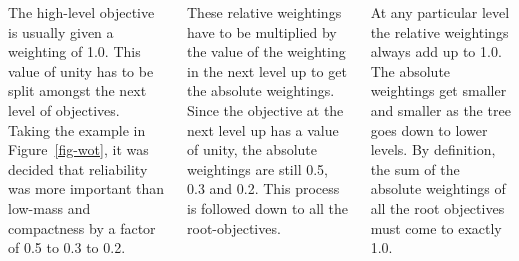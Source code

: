 \documentclass[20pt, a0paper, portrait]{tikzposter}
\begin{document}
\begin{columns}
{      \vspace{1em}

      The high-level objective is usually given a weighting of 1.0. This value of unity has to be split amongst the next level of objectives. Taking the example in Figure~\ref{fig-wot}, it was decided that reliability was more important than low-mass and compactness by a factor of 0.5 to 0.3 to 0.2.

      \vspace{1em}

      These relative weightings have to be multiplied by the value of the weighting in the next level up to get the absolute weightings. Since the objective at the next level up has a value of unity, the absolute weightings are still 0.5, 0.3 and 0.2. This process is followed down to all the root-objectives. 

      \vspace{1em}

      At any particular level the relative weightings always add up to 1.0. The absolute weightings get smaller and smaller as the tree goes down to lower levels. By definition, the sum of the absolute weightings of all the root objectives must come to exactly 1.0.
    }


\end{columns}
\end{document}
